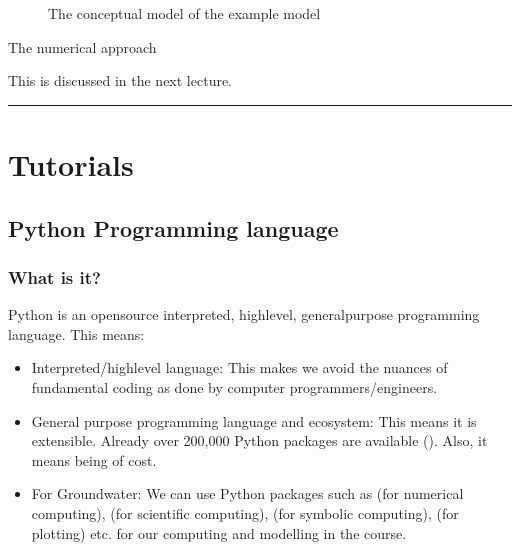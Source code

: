 \documentclass[letterpaper,10pt,english]{jupyterBook}
\begin{document}
\begin{figure}[htbp]
\centering
\capstart

\noindent{}
\caption{The conceptual model of the example model}\label{\detokenize{content/modeling/31_intro_modeling:concept-model}}\end{figure}

\sphinxAtStartPar
{} \sphinxhyphen{} The numerical approach

\sphinxAtStartPar
This is discussed in the next lecture.


\bigskip\hrule\bigskip


\sphinxstepscope


\part{Tutorials}

\sphinxstepscope


\chapter{Python Programming language}
\label{\detokenize{content/background/01_python:python-programming-language}}\label{\detokenize{content/background/01_python::doc}}

\section{What is it?}
\label{\detokenize{content/background/01_python:what-is-it}}
\sphinxAtStartPar
Python is an open\sphinxhyphen{}source interpreted, high\sphinxhyphen{}level, general\sphinxhyphen{}purpose programming language. This means:
\begin{itemize}
\item {} 
\sphinxAtStartPar
Interpreted/high\sphinxhyphen{}level language: This makes we avoid the nuances of fundamental coding as done by computer programmers/engineers.

\item {} 
\sphinxAtStartPar
General purpose programming language and  ecosystem: This means it is extensible. Already over 200,000 Python packages are available (). Also, it means being  of cost.

\item {} 
\sphinxAtStartPar
For Groundwater: We can use Python packages such as  (for numerical computing),  (for scientific computing),  (for symbolic computing),  (for plotting) etc. for our computing and modelling in the course.

\end{itemize}
\end{document}
